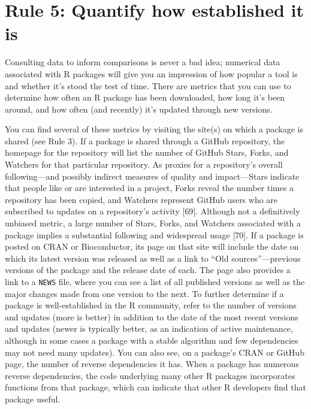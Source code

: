 \documentclass[10pt,letterpaper]{article}
\begin{document}
\hypertarget{rule-5-quantify-how-established-it-is}{%
\section{Rule 5: Quantify how established it
is}\label{rule-5-quantify-how-established-it-is}}

Consulting data to inform comparisons is never a bad idea; numerical
data associated with R packages will give you an impression of how
popular a tool is and whether it's stood the test of time. There are
metrics that you can use to determine how often an R package has been
downloaded, how long it's been around, and how often (and recently) it's
updated through new versions.

You can find several of these metrics by visiting the site(s) on which a
package is shared (see Rule 3). If a package is shared through a GitHub
repository, the homepage for the repository will list the number of
GitHub Stars, Forks, and Watchers for that particular repository. As
proxies for a repository's overall following---and possibly indirect
measures of quality and impact---Stars indicate that people like or are
interested in a project, Forks reveal the number times a repository has
been copied, and Watchers represent GitHub users who are subscribed to
updates on a repository's activity {[}69{]}. Although not a definitively
unbiased metric, a large number of Stars, Forks, and Watchers associated
with a package implies a substantial following and widespread usage
{[}70{]}. If a package is posted on CRAN or Bioconductor, its page on
that site will include the date on which its latest version was released
as well as a link to ``Old sources''---previous versions of the package
and the release date of each. The page also provides a link to a
\texttt{NEWS} file, where you can see a list of all published versions
as well as the major changes made from one version to the next. To
further determine if a package is well-established in the R community,
refer to the number of versions and updates (more is better) in addition
to the date of the most recent versions and updates (newer is typically
better, as an indication of active maintenance, although in some cases a
package with a stable algorithm and few dependencies may not need many
updates). You can also see, on a package's CRAN or GitHub page, the
number of reverse dependencies it has. When a package has numerous
reverse dependencies, the code underlying many other R packages
incorporates functions from that package, which can indicate that other
R developers find that package useful.
\end{document}
